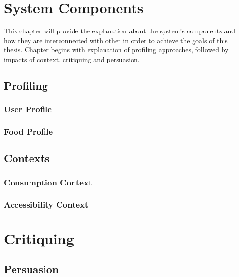 
\chapter{System Components}

This chapter will provide the explanation about the system’s components and how they are interconnected with other in order to achieve the goals of this thesis. Chapter begins with explanation of profiling approaches, followed by impacts of context, critiquing and persuasion.

\section{Profiling}

\subsection{User Profile}
\subsection{Food Profile}

\section{Contexts}

\subsection{Consumption Context}

\subsection{Accessibility Context}

\chapter{Critiquing}

\section{Persuasion}